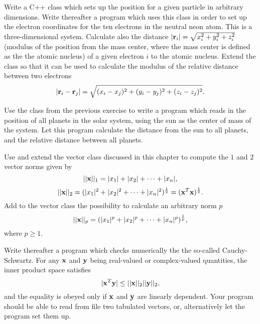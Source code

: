 \begin{prob}
Write a C++ class which sets up the position for a given particle in arbitrary dimensions.
Write thereafter a program which uses this class in order to set up the electron coordinates 
for the ten electrons in the neutral neon atom. This is a three-dimensional system.
Calculate also the distance $|{\bf r}_i|=\sqrt{x_i^2+y_i^2+z_i^2}$ (modulus of the position from the mass center, where the mass center is defined as the the atomic nucleus)
of a given electron $i$ to the atomic nucleus. Extend the class so that it can be used to calculate the modulus
of the relative distance between two electrons
\[
|{\bf r}_i-{\bf r}_j|=\sqrt{(x_i-x_j)^2+(y_i-y_j)^2+(z_i-z_j)^2}.
\] 
\end{prob}


\begin{prob}
Use the class from the previous exercise to write a program which reads in the position of all planets in the solar system, using the sun as the center of mass of the system.
Let this program calculate the distance from the sun to all planets, and the relative distance between all planets.
\end{prob}


\begin{prob}
Use and extend the vector class discussed in this chapter 
to compute the 
$1$ and $2$ vector norms given by
\[
 ||{\bf x}||_1 = |x_1|+|x_2|+\dots + |x_n|,
\]
\[
||{\bf x}||_2 = (|x_1|^2+|x_2|^2+\dots + |x_n|^2)^{\frac{1}{2}}=({\bf x}^T{\bf x})^{\frac{1}{2}}.
\]
Add to the vector class the possibility to calculate an arbitrary norm $p$
\[
||{\bf x}||_p = (|x_1|^p+|x_2|^p+\dots + |x_n|^p)^{\frac{1}{p}},
\] 
where $p \ge 1$. 

Write thereafter a program which checks numerically the
the so-called Cauchy-Schwartz. For any ${\bf x}$ and ${\bf y}$ being 
real-valued or complex-valued quantities, the  inner product space satisfies
\[
   |{\bf x}^T{\bf y}| \le ||{\bf x}||_2||{\bf y}||_2,
\]
and the equality is obeyed only if ${\bf x}$ and ${\bf y}$ are linearly dependent. 
Your program
should be able to read from file two tabulated vectors, or, alternatively let the program
set them up.
\end{prob}
